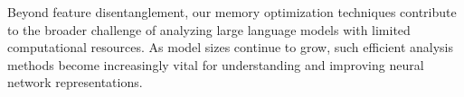 \documentclass{article} %
\begin{document}
Beyond feature disentanglement, our memory optimization techniques contribute to the broader challenge of analyzing large language models with limited computational resources. As model sizes continue to grow, such efficient analysis methods become increasingly vital for understanding and improving neural network representations.



\end{document}
